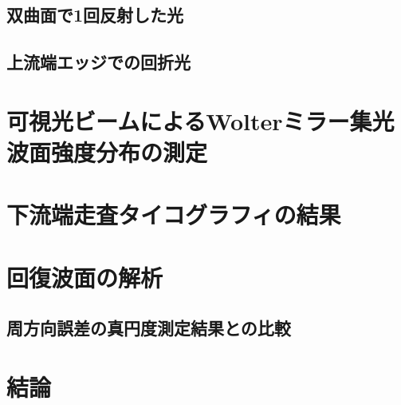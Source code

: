 \subsection{双曲面で1回反射した光}


\subsection{上流端エッジでの回折光}
\label{chap5_}

\clearpage

\newpage

\section{可視光ビームによるWolterミラー集光波面強度分布の測定}



\clearpage

\newpage

\section{下流端走査タイコグラフィの結果}

\clearpage
\newpage

\section{回復波面の解析}
\subsection{周方向誤差の真円度測定結果との比較}

\section{結論}
\label{chap5_conclusion}



